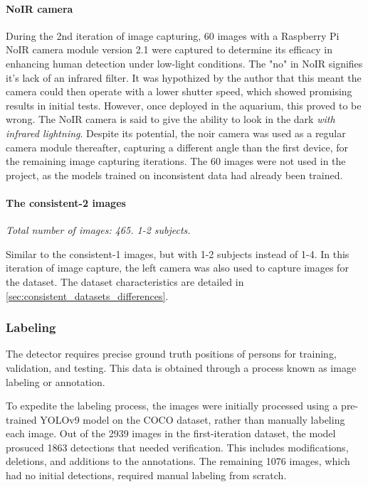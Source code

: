 \paragraph{NoIR camera}
During the 2nd iteration of image capturing, 60 images with a Raspberry Pi NoIR camera module version 2.1 were captured to determine its efficacy in enhancing human detection under low-light conditions. The "no" in NoIR signifies it's lack of an infrared filter. It was hypothized by the author that this meant the camera could then operate with a lower shutter speed, which showed promising results in initial tests. However, once deployed in the aquarium, this proved to be wrong. The NoIR camera is said to give the ability to look in the dark \textit{with infrared lightning}. Despite its potential, the noir camera was used as a regular camera module thereafter, capturing a different angle than the first device, for the remaining image capturing iterations. The 60 images were not used in the project, as the models trained on inconsistent data had already been trained.

\paragraph{The consistent-2 images}
\textit{Total number of images: 465. 1-2 subjects.}

Similar to the consistent-1 images, but with 1-2 subjects instead of 1-4. In this iteration of image capture, the left camera was also used to capture images for the dataset. The dataset characteristics are detailed in \ref{sec:consistent_datasets_differences}.

\subsubsection{Labeling}
\label{sec:labeling}

The detector requires precise ground truth positions of persons for training, validation, and testing. This data is obtained through a process known as image labeling or annotation.

To expedite the labeling process, the images were initially processed using a pre-trained YOLOv9 model on the COCO dataset, rather than manually labeling each image. Out of the 2939 images in the first-iteration dataset, the model prosuced 1863 detections that needed verification. This includes modifications, deletions, and additions to the annotations. The remaining 1076 images, which had no initial detections, required manual labeling from scratch.


